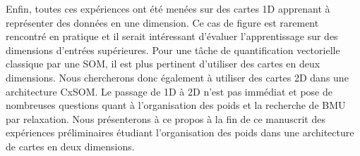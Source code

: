 \documentclass[../main]{subfiles}
\begin{document}
Enfin, toutes ces expériences ont été menées sur des cartes 1D apprenant à représenter des données en une dimension. Ce cas de figure est rarement rencontré en pratique et il serait intéressant d'évaluer l'apprentissage sur des dimensions d'entrées supérieures. Pour une tâche de quantification vectorielle classique par une SOM, il est plus pertinent d'utiliser des cartes en deux dimensions. Nous chercherons donc également à utiliser des cartes 2D dans une architecture CxSOM. Le passage de 1D à 2D n'est pas immédiat et pose de nombreuses questions quant à l'organisation des poids et la recherche de BMU par relaxation. 
Nous présenterons à ce propos à la fin de ce manuscrit des expériences préliminaires étudiant l'organisation des poids dans une architecture de cartes en deux dimensions.

\ifSubfilesClassLoaded{
    \printbibliography
}{}
\end{document}
